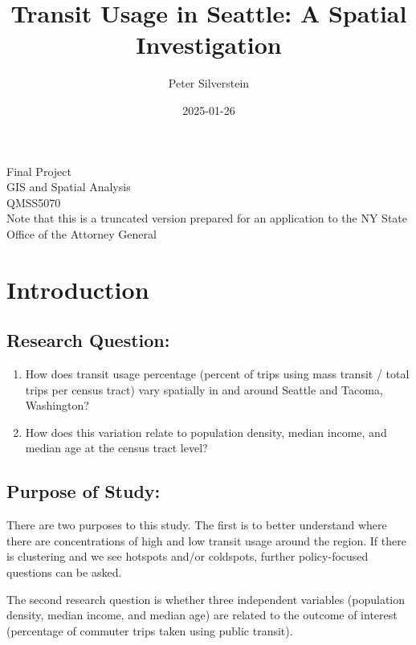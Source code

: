 \documentclass[
]{article}
\title{Transit Usage in Seattle: A Spatial Investigation}
\author{Peter Silverstein}
\date{2025-01-26}
\providecommand{\tightlist}{%
  \setlength{\itemsep}{0pt}\setlength{\parskip}{0pt}}
\begin{document}
\maketitle

\begin{center}
    {\large Final Project}\\[0.5cm]
    {\large GIS and Spatial Analysis}\\[0.5cm]
    {\large QMSS5070}\\[0.5cm]
    {\large Note that this is a truncated version prepared for an application to the NY State Office of the Attorney General}\\[0.5cm]
\end{center}

\newpage

\tableofcontents

\newpage

\section{Introduction}\label{introduction}

\subsection{Research Question:}\label{research-question}

\begin{enumerate}
\def\labelenumi{\arabic{enumi}.}
\tightlist
\item
  How does transit usage percentage (percent of trips using mass transit
  / total trips per census tract) vary spatially in and around Seattle
  and Tacoma, Washington?
\item
  How does this variation relate to population density, median income,
  and median age at the census tract level?
\end{enumerate}

\subsection{Purpose of Study:}\label{purpose-of-study}

There are two purposes to this study. The first is to better understand
where there are concentrations of high and low transit usage around the
region. If there is clustering and we see hotspots and/or coldspots,
further policy-focused questions can be asked.

The second research question is whether three independent variables
(population density, median income, and median age) are related to the
outcome of interest (percentage of commuter trips taken using public
transit).
\end{document}
